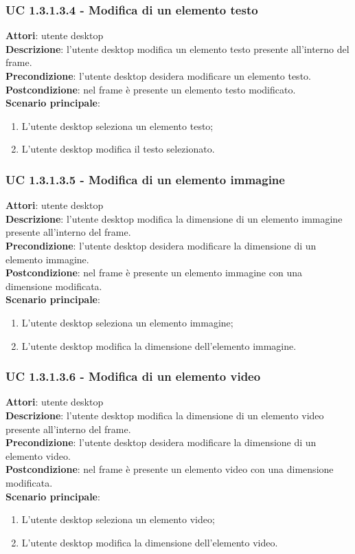 \subsubsection{UC 1.3.1.3.4 - Modifica di un elemento testo}{
	\label{uc1.3.1.3.4}
	\textbf{Attori}: utente desktop \\
	\textbf{Descrizione}: l'utente desktop modifica un elemento testo presente all'interno del frame. \\
	\textbf{Precondizione}: l'utente desktop desidera modificare un elemento testo.	\\
	\textbf{Postcondizione}: nel frame è presente un elemento testo modificato.	\\
	\textbf{Scenario principale}:
	\begin{enumerate}
		\item L'utente desktop seleziona un elemento testo;
		\item L'utente desktop modifica il testo selezionato.
	\end{enumerate}
	}
\subsubsection{UC 1.3.1.3.5 - Modifica di un elemento immagine}{
	\label{uc1.3.1.3.5}
	\textbf{Attori}: utente desktop \\
	\textbf{Descrizione}: l'utente desktop modifica la dimensione di un elemento immagine presente all'interno del frame. \\
	\textbf{Precondizione}: l'utente desktop desidera modificare la dimensione di un elemento immagine.	\\
	\textbf{Postcondizione}: nel frame è presente un elemento immagine con una dimensione modificata.	\\
	\textbf{Scenario principale}:
	\begin{enumerate}
		\item L'utente desktop seleziona un elemento immagine;
		\item L'utente desktop modifica la dimensione dell'elemento immagine.
	\end{enumerate}
	}
\subsubsection{UC 1.3.1.3.6 - Modifica di un elemento video}{
	\label{uc1.3.1.3.6}
	\textbf{Attori}: utente desktop \\
	\textbf{Descrizione}: l'utente desktop modifica la dimensione di un elemento video presente all'interno del frame. \\
	\textbf{Precondizione}: l'utente desktop desidera modificare la dimensione di un elemento video.	\\
	\textbf{Postcondizione}: nel frame è presente un elemento video con una dimensione modificata.	\\
	\textbf{Scenario principale}:
	\begin{enumerate}
		\item L'utente desktop seleziona un elemento video;
		\item L'utente desktop modifica la dimensione dell'elemento video.
	\end{enumerate}
	}
